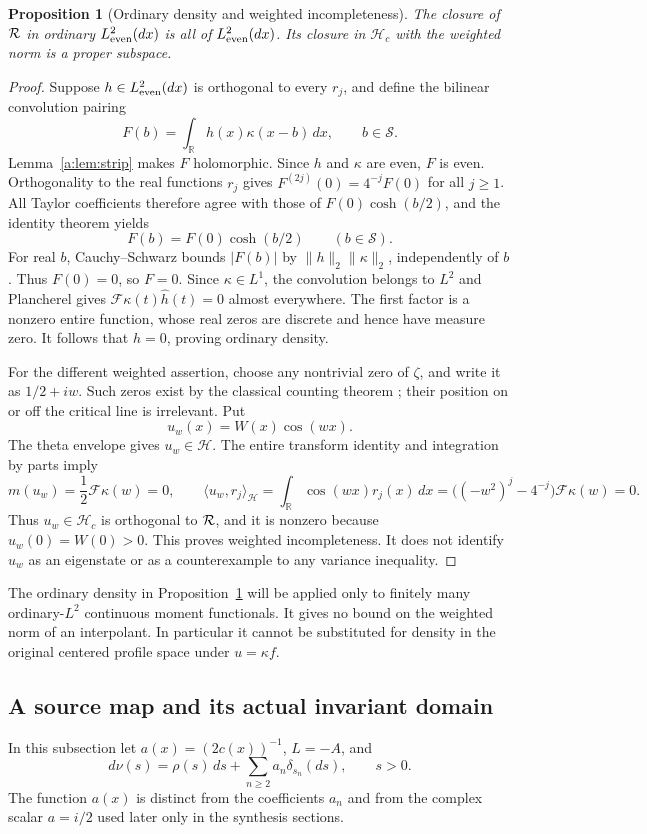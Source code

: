 \documentclass[11pt,a4paper]{article}
\numberwithin{equation}{section}
\newtheorem{proposition}[theorem]{Proposition}
\theoremstyle{definition}\newtheorem{definition}[theorem]{Definition}
\theoremstyle{remark}\newtheorem{remark}[theorem]{Remark}
\newcommand{\R}{\mathbb R}\newcommand{\C}{\mathbb C}\newcommand{\N}{\mathbb N}
\newcommand{\Hh}{\mathcal H}\newcommand{\Hw}{\mathcal H}
\newcommand{\ip}[2]{\langle#1,#2\rangle}\newcommand{\norm}[1]{\lVert#1\rVert}\newcommand{\abs}[1]{\lvert#1\rvert}
\begin{document}
\begin{proposition}[Ordinary density and weighted incompleteness]\label{a:prop:density}
The closure of $\mathcal R$ in ordinary $L^2_{\mathrm{even}}(dx)$ is all of $L^2_{\mathrm{even}}(dx)$. Its closure in $\Hh_c$ with the weighted norm is a proper subspace.
\end{proposition}
\begin{proof}
Suppose $h\in L^2_{\mathrm{even}}(dx)$ is orthogonal to every $r_j$, and define the bilinear convolution pairing
\[
 F(b)=\int_\R h(x)\kappa(x-b)\,dx,\qquad b\in\mathcal S.
\]
Lemma~\ref{a:lem:strip} makes $F$ holomorphic. Since $h$ and $\kappa$ are even, $F$ is even. Orthogonality to the real functions $r_j$ gives
$F^{(2j)}(0)=4^{-j}F(0)$ for all $j\ge1$.
All Taylor coefficients therefore agree with those of $F(0)\cosh(b/2)$, and the identity theorem yields
\[
 F(b)=F(0)\cosh(b/2)\qquad(b\in\mathcal S).
\]
For real $b$, Cauchy--Schwarz bounds $|F(b)|$ by
$\norm h_2\norm\kappa_2$, independently of $b$. Thus $F(0)=0$, so $F=0$. Since $\kappa\in L^1$, the convolution belongs to $L^2$ and Plancherel gives
$\mathcal F\kappa(t)\widehat h(t)=0$ almost everywhere. The first factor is a nonzero entire function, whose real zeros are discrete and hence have measure zero. It follows that $h=0$, proving ordinary density.

For the different weighted assertion, choose any nontrivial zero of $\zeta$, and write it as $1/2+iw$. Such zeros exist by the classical counting theorem \cite{vonMangoldt}; their position on or off the critical line is irrelevant. Put
\[
 u_w(x)=W(x)\cos(wx).
\]
The theta envelope gives $u_w\in\Hw$. The entire transform identity and integration by parts imply
\[
 m(u_w)=\frac12\mathcal F\kappa(w)=0,\qquad
 \ip{u_w}{r_j}_{\Hh}
 =\int_\R\cos(wx)r_j(x)\,dx
 =\bigl((-w^2)^j-4^{-j}\bigr)\mathcal F\kappa(w)=0.
\]
Thus $u_w\in \Hh_c$ is orthogonal to $\mathcal R$, and it is nonzero because $u_w(0)=W(0)>0$. This proves weighted incompleteness. It does not identify $u_w$ as an eigenstate or as a counterexample to any variance inequality.
\end{proof}

The ordinary density in Proposition~\ref{a:prop:density} will be applied only to finitely many ordinary-$L^2$ continuous moment functionals. It gives no bound on the weighted norm of an interpolant. In particular it cannot be substituted for density in the original centered profile space under $u=\kappa f$.


\subsection{A source map and its actual invariant domain}\label{b:sec:source}
In this subsection let $a(x)=(2c(x))^{-1}$, $L=-A$, and
\begin{equation}\label{b:eq:nu}
 d\nu(s)=\rho(s)\,ds+\sum_{n\ge2}a_n\delta_{s_n}(ds),\qquad s>0.
\end{equation}
The function $a(x)$ is distinct from the coefficients $a_n$ and from the complex scalar $a=i/2$ used later only in the synthesis sections.
\end{document}
